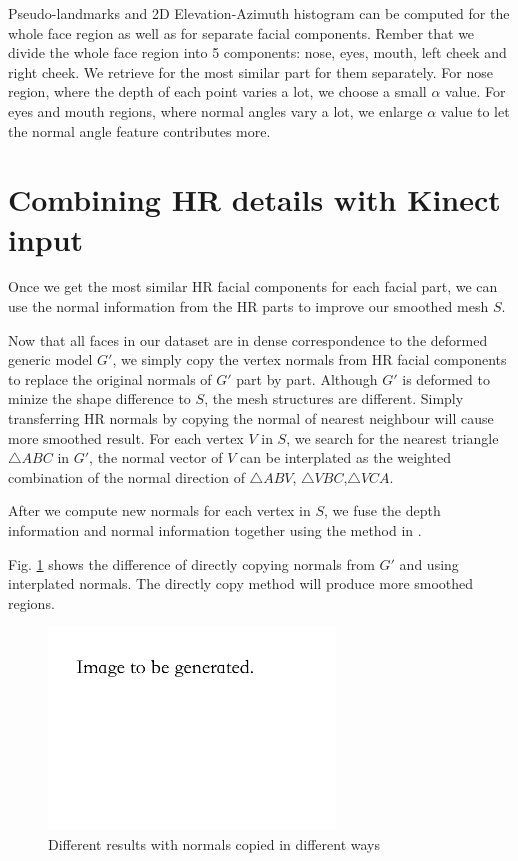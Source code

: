 \documentclass[annual]{acmsiggraph}
\begin{document}
Pseudo-landmarks and 2D Elevation-Azimuth histogram can be computed for the whole face region as well as for separate facial components. Rember that we divide the whole face region into 5 components: nose, eyes, mouth, left cheek and right cheek. We retrieve for the most similar part for them separately. For nose region, where the depth of each point varies a lot, we choose a small $\alpha$ value. For eyes and mouth regions, where normal angles vary a lot, we enlarge $\alpha$ value to let the normal angle feature contributes more.
 
\section{Combining HR details with Kinect input}
Once we get the most similar HR facial components for each facial part, we can use the normal information from the HR parts to improve our smoothed mesh $S$. 

Now that all faces in our dataset are in dense correspondence to the deformed generic model $G'$, we simply copy the vertex normals from HR facial components to replace the original normals of $G'$ part by part. Although $G'$ is deformed to minize the shape difference to $S$, the mesh structures are different. Simply transferring HR normals by copying the normal of nearest neighbour will cause more smoothed result. For each vertex $V$ in $S$, we search for the nearest triangle ${\triangle}ABC$ in $G'$, the normal vector of $V$ can be interplated as the weighted combination of the normal direction of ${\triangle}ABV$, ${\triangle}VBC$,${\triangle}VCA$.

After we compute new normals for each vertex in $S$, we fuse the depth information and normal information together using the method in \cite{normal}.

Fig. \ref{normal} shows the difference of directly copying normals from $G'$ and using interplated normals. The directly copy method will produce more smoothed regions.

\begin{figure}[ht]
  \centering
  \includegraphics[width=3in]{images/normal}
  \caption{Different results with normals copied in different ways}\label{normal}
\end{figure}
\end{document}
